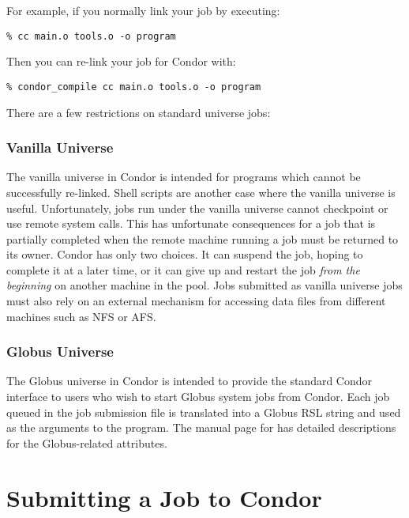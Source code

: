 For example, if you normally link your job by executing:
\begin{verbatim}
% cc main.o tools.o -o program
\end{verbatim}

Then you can re-link your job for Condor with:
\begin{verbatim}
% condor_compile cc main.o tools.o -o program
\end{verbatim}

There are a few restrictions on standard universe jobs:




\subsubsection{Vanilla Universe}

The vanilla universe in Condor is intended
for programs which cannot
be successfully re-linked.
Shell scripts are another case where the vanilla universe
is useful.
Unfortunately, jobs run under the vanilla universe cannot checkpoint or use
remote system calls. 
This has unfortunate consequences for a job that is partially
completed 
when the remote machine running a job must be returned
to its owner.
Condor has only two choices.  It can suspend the job, hoping to
complete it at a later time,
or it can give up and restart the job \emph{from the beginning} 
on another machine in the pool.
Jobs submitted as vanilla universe jobs must also rely on an
external mechanism 
for accessing data files from different machines
such as NFS or AFS.

\subsubsection{Globus Universe}

The Globus universe in Condor is intended to provide the standard
Condor interface to users who wish to start Globus system jobs
from Condor. Each job queued in the job submission file is translated
into a Globus RSL string and used as the arguments to the 
program. The manual page for  has detailed descriptions for
the Globus-related attributes.

\section{Submitting a Job to Condor}

